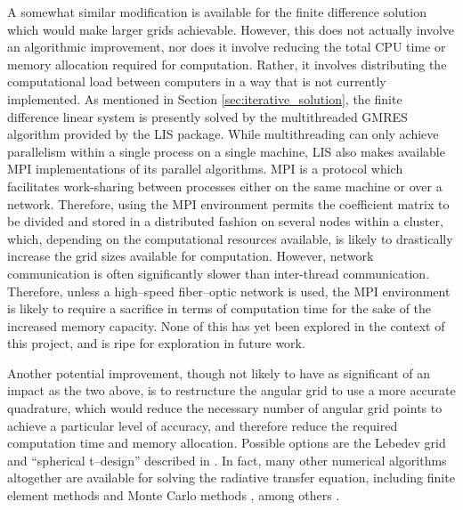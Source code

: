 A somewhat similar modification is available for the finite difference solution which would make larger grids achievable.
However, this does not actually involve an algorithmic improvement, nor does it involve reducing the total CPU time or memory allocation required for computation.
Rather, it involves distributing the computational load between computers in a way that is not currently implemented.
As mentioned in Section \ref{sec:iterative_solution}, the finite difference linear system is presently solved by the multithreaded GMRES algorithm provided by the LIS package.
While multithreading can only achieve parallelism within a single process on a single machine, LIS also makes available MPI implementations of its parallel algorithms.
MPI is a protocol which facilitates work-sharing between processes either on the same machine or over a network.
Therefore, using the MPI environment permits the coefficient matrix to be divided and stored in a distributed fashion on several nodes within a cluster, which, depending on the computational resources available, is likely to drastically increase the grid sizes available for computation.
However, network communication is often significantly slower than inter-thread communication.
Therefore, unless a high--speed fiber--optic network is used, the MPI environment is likely to require a sacrifice in terms of computation time for the sake of the increased memory capacity.
None of this has yet been explored in the context of this project, and is ripe for exploration in future work.

Another potential improvement, though not likely to have as significant of an impact as the two above, is to restructure the angular grid to use a more accurate quadrature, which would reduce the necessary number of angular grid points to achieve a particular level of accuracy, and therefore reduce the required computation time and memory allocation.
Possible options are the Lebedev grid and ``spherical t--design'' described in \citep{bentjes}.
In fact, many other numerical algorithms altogether are available for solving the radiative transfer equation, including finite element methods \citep{FEM} and Monte Carlo methods \citep{mc}, among others \citep{other,rte,methods}.

